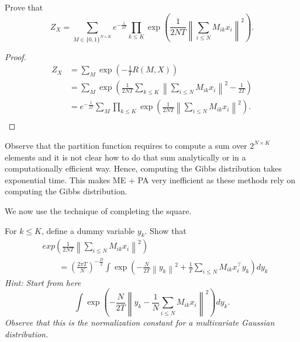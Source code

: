 \begin{exercise}
Prove that
%
\begin{equation}
Z_X = \sum_{M \in \{0, 1\}^{N \times K}}e^{-\frac{1}{2T}}\prod_{k \leq K} \exp\left(\frac{1}{2NT}\left\|\sum_{i \leq N} M_{ik}x_i\right\|^2\right).
\label{eq:partition_function}
\end{equation}
%
\end{exercise}

\begin{proof}
\begin{align*}
Z_X &= \sum_{M} \exp\left(-\frac{1}{T}R(M, X)\right)\\
&= \sum_{M} \exp\left(\frac{1}{2NT}\sum_{k \leq K}\left\|\sum_{i \leq N} M_{ik}x_i\right\|^2 - \frac{1}{2T}\right)\\
&= e^{-\frac{1}{2T}}\sum_{M} \prod_{k \leq K}\exp\left(\frac{1}{2NT}\left\|\sum_{i \leq N} M_{ik}x_i\right\|^2\right).\\
\end{align*}
\end{proof}

Observe that the partition function requires to compute a sum over $2^{N \times K}$ elements and it is not clear how to do that sum analytically or in a computationally efficient way. Hence, computing the Gibbs distribution takes exponential time. This makes ME + PA very inefficient as these methods rely on computing the Gibbs distribution.

We now use the technique of completing the square.

\begin{exercise}
For $k \leq K$, define a dummy variable $y_k$. Show that
%
\begin{align}
&exp\left(\frac{1}{2NT}\left\|\sum_{i \leq N} M_{ik}x_i\right\|^2\right)\\
&\qquad = \left(\frac{2\pi T}{N}\right)^{-\frac{D}{2}} \int \exp\left(- \frac{N}{2T}\left\|y_k\right\|^2 + \frac{1}{T}\sum_{i \leq N}M_{ik}x_i^\top y_k\right)dy_k
\label{eq:partition_trick}
\end{align}
%
\textit{Hint: Start from here
%
$$\int \exp\left(-\frac{N}{2T} \left\|y_k - \frac{1}{N}\sum_{i \leq N}M_{ik}x_i\right\|^2\right)dy_k.$$
%
Observe that this is the normalization constant for a multivariate Gaussian distribution.}
\end{exercise}

